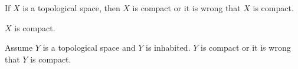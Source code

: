
If $X$ is a topological space, then $X$ is compact or it is wrong that
    $X$ is compact.

$X$ is compact.

Assume $Y$ is a topological space and $Y$ is inhabited.
$Y$ is compact or it is wrong that $Y$ is compact.
